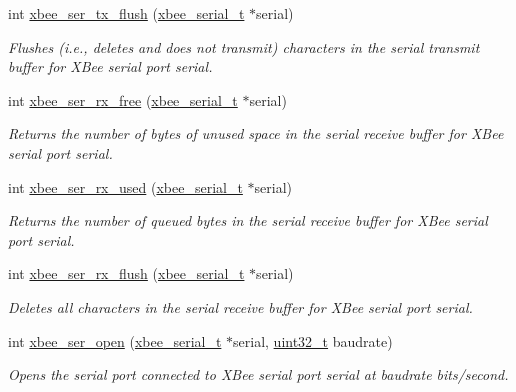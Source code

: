 \begin{DoxyCompactItemize}
int \hyperlink{group__hal__rabbit_ga05308d37301d27715f1e1308b7189220}{xbee\+\_\+ser\+\_\+tx\+\_\+flush} (\hyperlink{structxbee__serial__t}{xbee\+\_\+serial\+\_\+t} $\ast$serial)
\begin{DoxyCompactList}\small\item\em Flushes (i.\+e., deletes and does not transmit) characters in the serial transmit buffer for X\+Bee serial port {\itshape serial}. \end{DoxyCompactList}\item 
int \hyperlink{group__hal__rabbit_ga16fb431a1e66861439518e562431821f}{xbee\+\_\+ser\+\_\+rx\+\_\+free} (\hyperlink{structxbee__serial__t}{xbee\+\_\+serial\+\_\+t} $\ast$serial)
\begin{DoxyCompactList}\small\item\em Returns the number of bytes of unused space in the serial receive buffer for X\+Bee serial port {\itshape serial}. \end{DoxyCompactList}\item 
int \hyperlink{group__hal__rabbit_ga43b8322771cc16b4130fa5330ad2242b}{xbee\+\_\+ser\+\_\+rx\+\_\+used} (\hyperlink{structxbee__serial__t}{xbee\+\_\+serial\+\_\+t} $\ast$serial)
\begin{DoxyCompactList}\small\item\em Returns the number of queued bytes in the serial receive buffer for X\+Bee serial port {\itshape serial}. \end{DoxyCompactList}\item 
int \hyperlink{group__hal__rabbit_ga98a6d5ceb5e1445e8ef82ccaa65a8c15}{xbee\+\_\+ser\+\_\+rx\+\_\+flush} (\hyperlink{structxbee__serial__t}{xbee\+\_\+serial\+\_\+t} $\ast$serial)
\begin{DoxyCompactList}\small\item\em Deletes all characters in the serial receive buffer for X\+Bee serial port {\itshape serial}. \end{DoxyCompactList}\item 
int \hyperlink{group__hal__rabbit_gaa615a221dd69c17ee2989c281f2bf04a}{xbee\+\_\+ser\+\_\+open} (\hyperlink{structxbee__serial__t}{xbee\+\_\+serial\+\_\+t} $\ast$serial, \hyperlink{group__hal__dos_ga09a1e304d66d35dd47daffee9731edaa}{uint32\+\_\+t} baudrate)
\begin{DoxyCompactList}\small\item\em Opens the serial port connected to X\+Bee serial port {\itshape serial} at {\itshape baudrate} bits/second. \end{DoxyCompactList}\item 

\end{DoxyCompactItemize}
